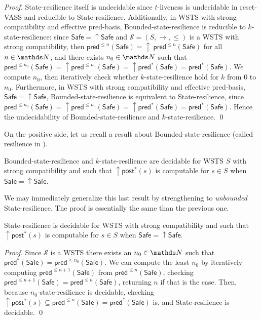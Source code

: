 \documentclass[runningheads]{llncs}
\newcommand{\pred}{\textsf{pred}}
\newcommand{\post}{\textsf{post}}
\newcommand{\Safe}{\textsf{Safe}}
\begin{document}
\begin{proof}
{\sc State-resilience} itself is undecidable 
since 
{\sc $t$-liveness} is undecidable in reset-VASS
and reducible to {\sc State-resilience}.
Additionally, in WSTS with strong compatibility and effective pred-basis, {\sc Bounded-state-resilience} is
reducible to {\sc $k$-state-resilience}:
since $\Safe=\uparrow \Safe$ and
$\mathscr{S}=(S,\rightarrow,\leq)$ is a WSTS with strong 
compatibility, then $\pred^{\leq n}(\Safe)= \uparrow~\pred^{\leq n}(\Safe)$ for all $n \in \N$,
and there exists $n_0 \in \N$ such that 
$\pred^{\leq n_0}(\Safe) = \uparrow \pred^{\leq n_0}(\Safe) = \uparrow \pred^*(\Safe) = \pred^*(\Safe)$.
We compute 
$n_0$, then iteratively check whether $k$-state-resilience 
hold for $k$ from $0$ to $n_0$.  
Furthermore, in WSTS with strong compatibility and effective pred-basis,  $\Safe=\uparrow \Safe$, {\sc Bounded-state-resilience} is equivalent to {\sc State-resilience},
since 
$\pred^{\leq n_0}(\Safe) = \uparrow \pred^{\leq n_0}(\Safe) = {\uparrow \pred^*(\Safe)} = \pred^*(\Safe)$.
Hence the undecidability of {\sc Bounded-state-resilience}
and 
 {\sc $k$-state-resilience}. \qed
\end{proof}






On the positive side, let us recall a result about {\sc Bounded-state-resilience} (called resilience in \cite{DBLP:conf/gg/Ozkan22,DBLP:journals/corr/abs-2108-00889}).
\begin{theorem}\cite{DBLP:conf/gg/Ozkan22,DBLP:journals/corr/abs-2108-00889}\label{ref ozkan}
{\sc Bounded-state-resilience} and {\sc $k$-state-resilience} are decidable for WSTS $S$ with strong compatibility and such that $\uparrow \post^*(s)$ is computable for $s \in S$
when
$\Safe=\uparrow \Safe$.
\end{theorem}

We may immediately generalize this last result by strengthening to \emph{unbounded} {\sc State-resilience}. The proof is essentially the same than the previous one.

\begin{corollary}\label{postcomputable}
{\sc State-resilience} is decidable for WSTS with strong compatibility and such that $\uparrow \post^*(s)$ is computable for $s \in S$
when
$\Safe=\uparrow \Safe$.
\end{corollary}

\begin{proof}
Since $\mathscr{S}$ is a WSTS there exists an $n_0 \in \N$ such that
$\pred^*(\Safe) =  \pred^{\leq n_0}(\Safe)$. We can compute the least $n_0$ by iteratively computing 
$\pred^{\leq n+1}(\Safe)$ from $\pred^{\leq n}(\Safe)$, checking 
$\pred^{\leq n+1}(\Safe) = \pred^{\leq n}(\Safe)$, 
returning $n$ if that is the case.
Then, because {\sc $n_0$-state-resilience} is decidable, 
checking $\uparrow \post^*(s) 
 \subseteq \pred^{\leq n}(\Safe) = \pred^*(\Safe)$ is,
and {\sc State-resilience} is decidable. \qed
\end{proof}
\end{document}
